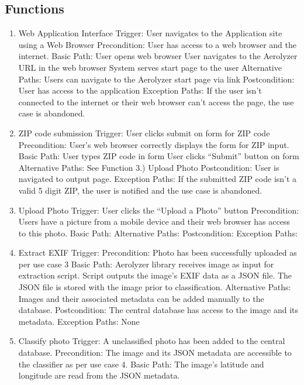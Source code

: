 \documentclass[journal,10pt,draftclsnofoot,onecolumn]{IEEEtran}
\begin{document}
\begin{singlespace}
\subsection{Functions}
\begin{enumerate}
\item Web Application Interface
Trigger: User navigates to the Application site using a Web Browser
Precondition: User has access to a web browser and the internet.
Basic Path:
User opens web browser
User navigates to the Aerolyzer URL in the web browser
System serves start page to the user
Alternative Paths: Users can navigate to the Aerolyzer start page via link
Postcondition: User has access to the application
Exception Paths: If the user isn’t connected to the internet or their web browser can’t access the page, the use case is abandoned.
\\
\item ZIP code submission
Trigger: User clicks submit on form for ZIP code
Precondition: User’s web browser correctly displays the form for ZIP input.
Basic Path:
User types ZIP code in form
User clicks “Submit” button on form
Alternative Paths: See Function 3.) Upload Photo
Postcondition: User is navigated to output page.
Exception Paths: If the submitted ZIP code isn’t a valid 5 digit ZIP, the user is notified and the use case is abandoned.
\\
\item Upload Photo
Trigger: User clicks the “Upload a Photo” button
Precondition: Users have a picture from a mobile device and their web browser has access to this photo.
Basic Path:
Alternative Paths:
Postcondition:
Exception Paths: 
\\
\item Extract EXIF
Trigger:
Precondition: Photo has been successfully uploaded as per use case 3
Basic Path: 
Aerolyzer library receives image as input for extraction script.
Script outputs the image’s EXIF data as a JSON file.
The JSON file is stored with the image prior to classification.
Alternative Paths: Images and their associated metadata can be added manually to the database.
Postcondition: The central database has access to the image and its metadata.
Exception Paths: None
\\
\item Classify photo
Trigger: A unclassified photo has been added to the central database.
Precondition: The image and its JSON metadata are accessible to the classifier as per use case 4.
Basic Path:
	The image’s latitude and longitude are read from the JSON metadata.

\end{enumerate}
\end{singlespace}
\end{document}
